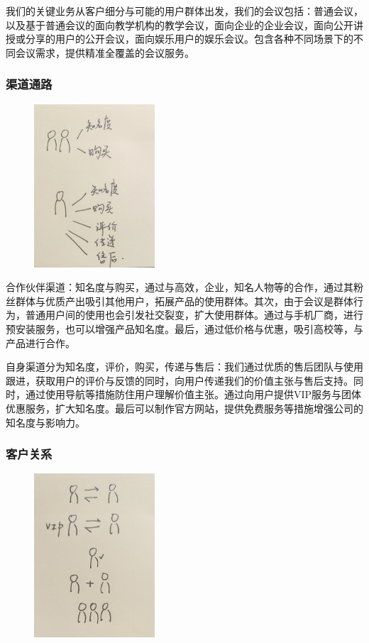 \documentclass[a4paper,12pt]{article}
\begin{document}
    我们的关键业务从客户细分与可能的用户群体出发，我们的会议包括：普通会议，以及基于普通会议的面向教学机构的教学会议，面向企业的企业会议，面向公开讲授或分享的用户的公开会议，面向娱乐用户的娱乐会议。包含各种不同场景下的不同会议需求，提供精准全覆盖的会议服务。
    \subsubsection{渠道通路}

    \begin{figure}[H]
        \centering
        \includegraphics[width=0.4\textwidth]{渠道通路.png}
    \end{figure}
    
    合作伙伴渠道：知名度与购买，通过与高效，企业，知名人物等的合作，通过其粉丝群体与优质产出吸引其他用户，拓展产品的使用群体。其次，由于会议是群体行为，普通用户间的使用也会引发社交裂变，扩大使用群体。通过与手机厂商，进行预安装服务，也可以增强产品知名度。最后，通过低价格与优惠，吸引高校等，与产品进行合作。
    
    自身渠道分为知名度，评价，购买，传递与售后：我们通过优质的售后团队与使用跟进，获取用户的评价与反馈的同时，向用户传递我们的价值主张与售后支持。同时，通过使用导航等措施防住用户理解价值主张。通过向用户提供VIP服务与团体优惠服务，扩大知名度。最后可以制作官方网站，提供免费服务等措施增强公司的知名度与影响力。
    \subsubsection{客户关系}

    \begin{figure}[H]
        \centering
        \includegraphics[width=0.4\textwidth]{客户关系.png}
    \end{figure}
    
\end{document}
